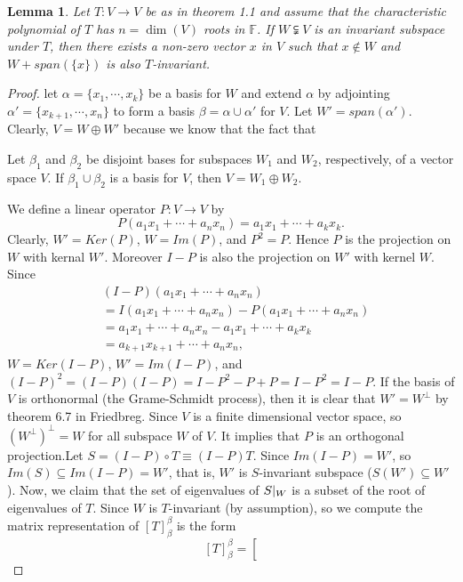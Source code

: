\documentclass[12pt,reqno]{amsart}
\theoremstyle{plain}
\newcommand{\F}{\mathbb{F}}
\newcommand{\kernal}[1]{Ker(#1)}
\newcommand{\image}[1]{Im(#1)}
\newcommand{\spanning}[1]{span(#1)}
\newtheorem*{lemma}{Lemma}
\theoremstyle{remark}
\begin{document}
\begin{lemma}
	Let $T:V \rightarrow V$ be as in theorem 1.1 and assume that the characteristic polynomial of $T$ has $n = \dim(V)$ roots in $\F$. If $W \subsetneqq V$ is an invariant subspace under $T$, then there exists a non-zero vector $x$ in $V$ such that $x \notin W$ and $W + \spanning{\{x\}}$ is also $T$-invariant.
\end{lemma}

\begin{proof}
	let $\alpha = \{x_1,\cdots,x_k\}$ be a basis for $W$ and extend $\alpha$ by adjointing $\alpha' = \{x_{k+1},\cdots,x_n\}$ to form a basis $\beta = \alpha \cup \alpha'$ for $V$. Let $W' = \spanning{\alpha'}$. Clearly, $V = W \oplus W'$ because we know that the fact that 
	\begin{tcolorbox}
		Let $\beta_1$ and $\beta_2$ be disjoint bases for subspaces $W_1$ and $W_2$, respectively, of a vector space $V$. If $\beta_1 \cup \beta_2$ is a basis for $V$, then $V = W_1 \oplus W_2$.
	\end{tcolorbox}	
	We define a linear operator $P:V \rightarrow V$ by	
	$$P(a_1x_1+\cdots+a_nx_n) = a_1x_1 + \cdots + a_kx_k.$$
	Clearly, $W' = \kernal{P}$, $W = \image{P}$, and $P^2 = P$. Hence $P$ is the projection on $W$ with kernal $W'$. Moreover $I - P$ is also the projection on $W'$ with kernel $W$. Since 
	\begin{align*}
		& (I-P)(a_1x_1+\cdots+a_nx_n) \\
		& = I(a_1x_1+\cdots+a_nx_n)-P(a_1x_1+\cdots+a_nx_n)\\
		& = a_1x_1+\cdots+a_nx_n-a_1x_1+\cdots+a_kx_k \\
		& = a_{k+1}x_{k+1} + \cdots + a_nx_n,
	\end{align*}
	 $W = \kernal{I - P}$, $W' = \image{I - P}$, and $(I - P)^2 = (I-P)(I-P) = I-P^2 - P + P = I-P^2 = I - P $. If the basis of $V$ is orthonormal (the Grame-Schmidt process), then it is clear that $W' = W^\perp$ by theorem 6.7 in Friedbreg. Since $V$ is a finite dimensional vector space, so $(W^\perp)^\perp = W$ for all subspace $W$ of $V$. It implies that $P$ is an orthogonal projection.Let $S = (I-P)\circ T \equiv (I-P)T $. Since $\image{I-P}= W'$, so $\image{S} \subseteq \image{I-P} = W'$, that is, $W'$ is $S$-invariant subspace ($S(W') \subseteq W'$). Now, we claim that the set of eigenvalues of $S\arrowvert_W$ is a subset of the root of eigenvalues of $T$. Since $W$ is $T$-invariant (by assumption), so we compute the matrix representation of $[T]^{\beta}_{\beta}$ is the form
	 $$[T]^{\beta}_{\beta} = \left[ 
$$
\end{proof}
\end{document}
